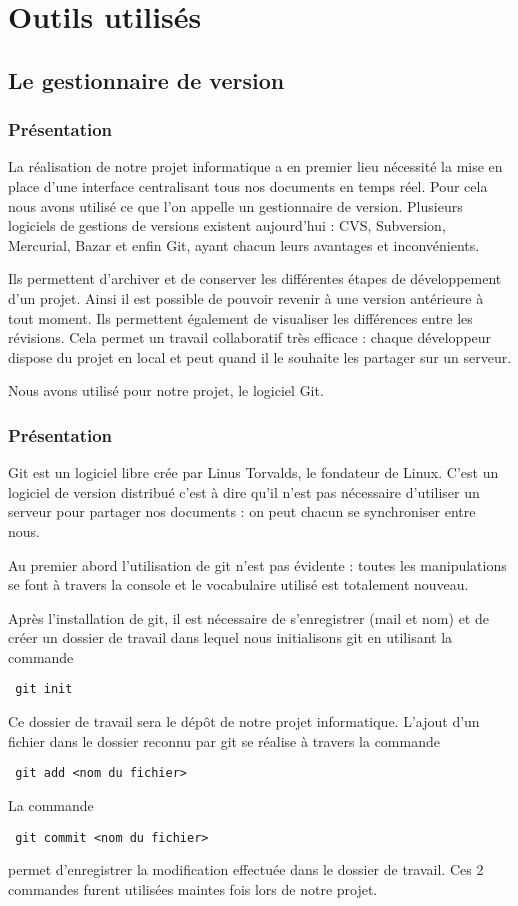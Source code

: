 \chapter{Outils utilis\'es}
\label{chap:outils utilises}

\section{Le gestionnaire de version }
\subsection{Pr\'esentation}

La r\'ealisation de notre projet informatique a en premier lieu n\'ecessit\'e la mise en place d'une interface centralisant tous nos
documents en temps r\'eel. Pour cela nous avons utilis\'e ce que l'on appelle un gestionnaire de version. Plusieurs logiciels de gestions 
de versions existent aujourd'hui : CVS, Subversion, Mercurial, Bazar et enfin Git, ayant chacun leurs avantages et inconv\'enients. 

Ils permettent d'archiver et de conserver les diff\'erentes \'etapes de d\'eveloppement d'un projet. Ainsi il est possible de pouvoir revenir
\`a une version ant\'erieure \`a tout moment. Ils permettent \'egalement de visualiser les diff\'erences entre les r\'evisions. Cela permet un  
travail collaboratif tr\`es efficace : chaque d\'eveloppeur dispose du projet en local et peut quand il le souhaite les partager sur un serveur.

Nous avons utilis\'e pour notre projet, le logiciel Git.

\subsection{Pr\'esentation}

Git est un logiciel libre cr\'ee par Linus Torvalds, le fondateur de Linux. C'est un logiciel de version distribu\'e c'est \`a dire qu'il n'est
 pas n\'ecessaire d'utiliser un serveur pour partager nos documents : on peut chacun se synchroniser entre nous.

Au premier abord l'utilisation de git n'est pas \'evidente : toutes les manipulations se font \`a travers la console et le vocabulaire utilis\'e 
est totalement nouveau. 

Apr\`es l'installation de git, il est n\'ecessaire de s'enregistrer (mail et nom) et de cr\'eer un dossier de travail dans lequel nous 
initialisons git en utilisant la commande
\begin{verbatim} git init \end{verbatim}
Ce dossier de travail sera le d\'ep\^ot de notre projet informatique. L'ajout d'un fichier dans le dossier reconnu par git se r\'ealise
 \`a travers la commande
\begin{verbatim} git add <nom du fichier> \end{verbatim}
La commande
\begin{verbatim} git commit <nom du fichier> \end{verbatim} permet d'enregistrer la modification effectu\'ee dans le dossier de travail.
Ces 2 commandes furent utilis\'ees maintes fois lors de notre projet. 

